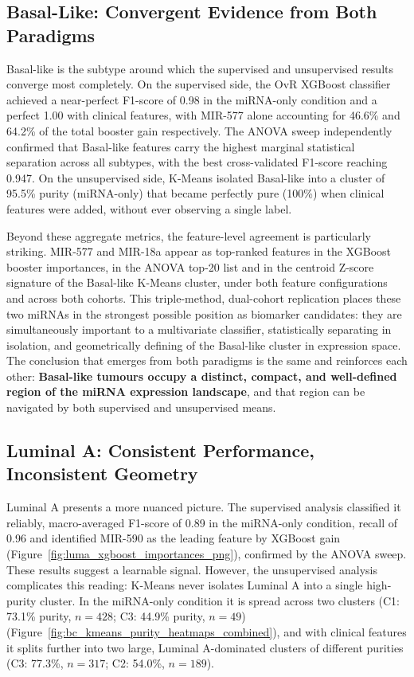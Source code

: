 \subsection{Basal-Like: Convergent Evidence from Both Paradigms}

Basal-like is the subtype around which the supervised and unsupervised results
converge most completely. On the supervised side, the OvR XGBoost classifier achieved
a near-perfect F1-score of 0.98 in the miRNA-only condition and a perfect 1.00 with
clinical features, with MIR-577 alone accounting for 46.6\% and 64.2\% of the total
booster gain respectively. The ANOVA sweep independently confirmed that Basal-like
features carry the highest marginal statistical separation across all subtypes, with
the best cross-validated F1-score reaching 0.947. On the unsupervised side, K-Means
isolated Basal-like into a cluster of 95.5\% purity (miRNA-only) that became
perfectly pure (100\%) when clinical features were added, without ever observing a
single label.

Beyond these aggregate metrics, the feature-level agreement is particularly striking.
MIR-577 and MIR-18a appear as top-ranked features in the XGBoost booster importances,
in the ANOVA top-20 list and in the centroid Z-score signature of the
Basal-like K-Means cluster, under both feature configurations and across both cohorts.
This triple-method, dual-cohort replication places these two miRNAs in the strongest
possible position as biomarker candidates: they are simultaneously important to a
multivariate classifier, statistically separating in isolation, and geometrically
defining of the Basal-like cluster in expression space. The conclusion that emerges
from both paradigms is the same and reinforces each other: \textbf{Basal-like tumours
occupy a distinct, compact, and well-defined region of the miRNA expression landscape},
and that region can be navigated by both supervised and unsupervised means.

\subsection{Luminal A: Consistent Performance, Inconsistent Geometry}

Luminal A presents a more nuanced picture. The supervised analysis classified it
reliably, macro-averaged F1-score of 0.89 in the miRNA-only condition, recall of
0.96 and identified MIR-590 as the leading feature by XGBoost gain 
(Figure~\ref{fig:luma_xgboost_importances_png}), confirmed by
the ANOVA sweep. These results suggest a learnable signal. However, the unsupervised
analysis complicates this reading: K-Means never isolates Luminal A into a single
high-purity cluster. In the miRNA-only condition it is spread across two clusters
(C1: 73.1\% purity, $n = 428$; C3: 44.9\% purity, $n = 49$) 
(Figure~\ref{fig:bc_kmeans_purity_heatmaps_combined}), and with clinical
features it splits further into two large, Luminal A-dominated clusters of different
purities (C3: 77.3\%, $n = 317$; C2: 54.0\%, $n = 189$).

